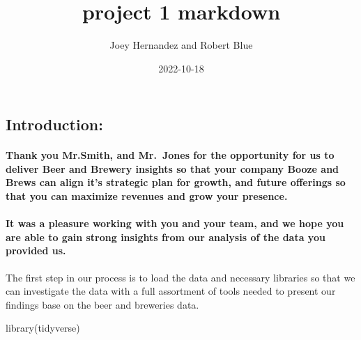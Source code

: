 \documentclass[
]{article}
\title{project 1 markdown}
\author{Joey Hernandez and Robert Blue}
\date{2022-10-18}
\newenvironment{Shaded}{\begin{snugshade}}{\end{snugshade}}
\newcommand{\FunctionTok}[1]{\textcolor[rgb]{0.00,0.00,0.00}{#1}}
\newcommand{\NormalTok}[1]{#1}
\begin{document}
\maketitle

\hypertarget{introduction}{%
\subsection{Introduction:}\label{introduction}}

\hypertarget{thank-you-mr.smith-and-mr.-jones-for-the-opportunity-for-us-to-deliver-beer-and-brewery-insights-so-that-your-company-booze-and-brews-can-align-its-strategic-plan-for-growth-and-future-offerings-so-that-you-can-maximize-revenues-and-grow-your-presence.}{%
\paragraph{Thank you Mr.Smith, and Mr.~Jones for the opportunity for us
to deliver Beer and Brewery insights so that your company Booze and
Brews can align it's strategic plan for growth, and future offerings so
that you can maximize revenues and grow your
presence.}\label{thank-you-mr.smith-and-mr.-jones-for-the-opportunity-for-us-to-deliver-beer-and-brewery-insights-so-that-your-company-booze-and-brews-can-align-its-strategic-plan-for-growth-and-future-offerings-so-that-you-can-maximize-revenues-and-grow-your-presence.}}

\hypertarget{it-was-a-pleasure-working-with-you-and-your-team-and-we-hope-you-are-able-to-gain-strong-insights-from-our-analysis-of-the-data-you-provided-us.}{%
\paragraph{It was a pleasure working with you and your team, and we hope
you are able to gain strong insights from our analysis of the data you
provided
us.}\label{it-was-a-pleasure-working-with-you-and-your-team-and-we-hope-you-are-able-to-gain-strong-insights-from-our-analysis-of-the-data-you-provided-us.}}

The first step in our process is to load the data and necessary
libraries so that we can investigate the data with a full assortment of
tools needed to present our findings base on the beer and breweries
data.

\begin{Shaded}
\begin{Highlighting}[]
\FunctionTok{library}\NormalTok{(tidyverse)}
\end{Highlighting}
\end{Shaded}
\end{document}
